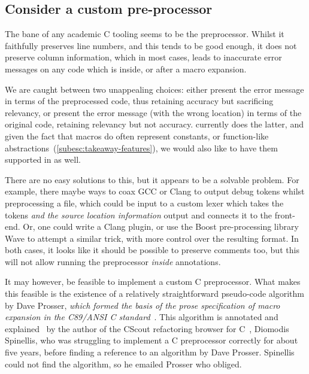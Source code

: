 \subsection{Consider a custom pre-processor}

The bane of any academic C tooling seems to be the preprocessor. Whilst it
faithfully preserves line numbers, and this tends to be good enough, it does
not preserve column information, which in most cases, leads to inaccurate error
messages on any code which is inside, or after a macro expansion.

We are caught between two unappealing choices: either present the error message
in terms of the preprocessed code, thus retaining accuracy but sacrificing
relevancy, or present the error message (with the wrong location) in terms of
the original code, retaining relevancy but not accuracy.  currently does
the latter, and given the fact that macros do often represent constants, or
function-like abstractions~(\cref{subesc:takeaway-features}), we would also
like to have them supported in  as well.

There are no easy solutions to this, but it appears to be a solvable problem. For
example, there maybe ways to coax GCC or Clang to output debug tokens whilst
preprocessing a file, which could be input to a custom lexer which takes the
tokens \emph{and the source location information} output and connects it to the
 front-end. Or, one could write a Clang plugin, or use the Boost
pre-processing library Wave to attempt a similar trick, with more control over
the resulting format. In both cases, it looks like it should be possible to
preserve comments too, but this will not allow running the preprocessor
\emph{inside}  annotations.

It may however, be feasible to implement a custom C preprocessor. What makes
this feasible is the existence of a relatively straightforward pseudo-code
algorithm by Dave Prosser, \emph{which formed the basis of the prose
    specification of macro expansion in the C89/ANSI C
standard}~. This algorithm is annotated and
explained~ by the author of the CScout
refactoring browser for C~, Diomodis
Spinellis, who was struggling to implement a C preprocessor correctly for about
five years, before finding a reference to an algorithm by Dave Prosser.
Spinellis could not find the algorithm, so he emailed Prosser who
obliged.

